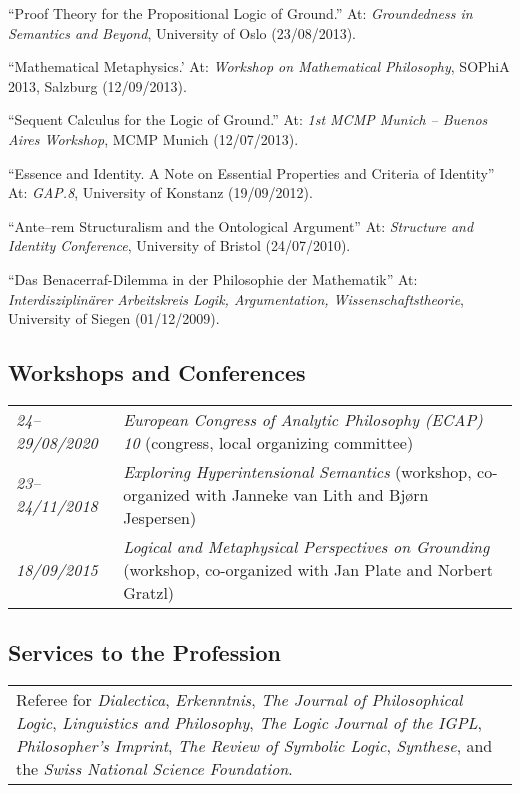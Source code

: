 \begin{etaremune}
  \item ``Proof Theory for the Propositional Logic of Ground.'' At: \emph{Groundedness in Semantics and Beyond}, University of Oslo (23/08/2013).
  \item ``Mathematical Metaphysics.' At: \emph{Workshop on Mathematical Philosophy}, SOPhiA 2013, Salzburg (12/09/2013).
  \item ``Sequent Calculus for the Logic of Ground.'' At: \emph{1st MCMP Munich -- Buenos Aires Workshop}, MCMP Munich (12/07/2013).
  \item ``Essence and Identity. A Note on Essential Properties and Criteria of Identity'' At: \emph{GAP.8}, University of Konstanz (19/09/2012).
  \item ``Ante--rem Structuralism and the Ontological Argument'' At: \emph{Structure and Identity Conference}, University of Bristol (24/07/2010).
  \item ``Das Benacerraf-Dilemma in der Philosophie der Mathematik'' At: \emph{Interdisziplin\"arer Arbeitskreis Logik, Argumentation, Wissenschaftstheorie}, University of Siegen (01/12/2009).
\end{etaremune}

\subsection*{Workshops and Conferences}
\begin{tabular}{l p{.8\linewidth}}
  \emph{24--29/08/2020} & \emph{European Congress of Analytic Philosophy (ECAP) 10} (congress, local organizing committee)\\[1ex]
  \emph{23--24/11/2018} & \emph{Exploring Hyperintensional Semantics} (workshop, co-organized with Janneke van Lith and Bj{\o}rn Jespersen)\\[1ex]
  \emph{18/09/2015} & \emph{Logical and Metaphysical Perspectives on Grounding} (workshop, co-organized with Jan Plate and Norbert Gratzl)\\
\end{tabular}

\subsection*{Services to the Profession}
\begin{tabular}{p{\linewidth}}
  Referee for \emph{Dialectica}, \emph{Erkenntnis}, \emph{The Journal of Philosophical Logic}, \emph{Linguistics and Philosophy}, \emph{The Logic Journal of the IGPL}, \emph{Philosopher's Imprint}, \emph{The Review of Symbolic Logic}, \emph{Synthese}, and the \emph{Swiss National Science Foundation}.
\end{tabular}

